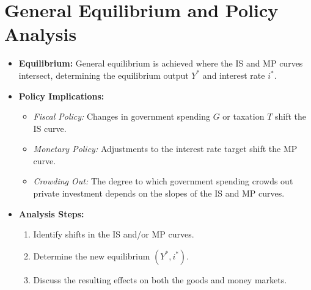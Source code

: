 \section*{General Equilibrium and Policy Analysis}
\begin{itemize}
    \item \textbf{Equilibrium:} General equilibrium is achieved where the IS and MP curves intersect, determining the equilibrium output \(Y^*\) and interest rate \(i^*\).
    \item \textbf{Policy Implications:}
    \begin{itemize}
        \item \emph{Fiscal Policy:} Changes in government spending \(G\) or taxation \(T\) shift the IS curve.
        \item \emph{Monetary Policy:} Adjustments to the interest rate target shift the MP curve.
        \item \emph{Crowding Out:} The degree to which government spending crowds out private investment depends on the slopes of the IS and MP curves.
    \end{itemize}
    \item \textbf{Analysis Steps:}
    \begin{enumerate}
        \item Identify shifts in the IS and/or MP curves.
        \item Determine the new equilibrium \((Y^*, i^*)\).
        \item Discuss the resulting effects on both the goods and money markets.
    \end{enumerate}
\end{itemize}